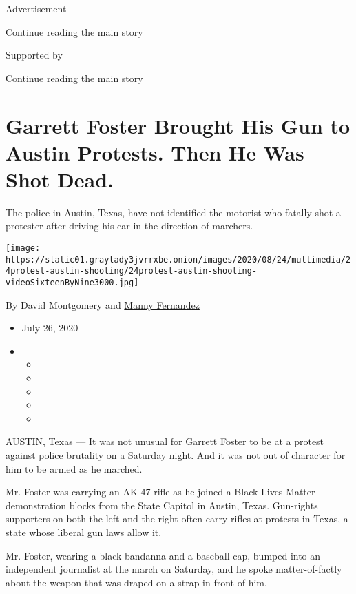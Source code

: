 Advertisement

\protect\hyperlink{after-top}{Continue reading the main story}

Supported by

\protect\hyperlink{after-sponsor}{Continue reading the main story}

\hypertarget{garrett-foster-brought-his-gun-to-austin-protests-then-he-was-shot-dead}{%
\section{Garrett Foster Brought His Gun to Austin Protests. Then He Was
Shot
Dead.}\label{garrett-foster-brought-his-gun-to-austin-protests-then-he-was-shot-dead}}

The police in Austin, Texas, have not identified the motorist who
fatally shot a protester after driving his car in the direction of
marchers.

\texttt{[image: https://static01.graylady3jvrrxbe.onion/images/2020/08/24/multimedia/24protest-austin-shooting/24protest-austin-shooting-videoSixteenByNine3000.jpg]}

By David Montgomery and
\href{https://www.nytimes3xbfgragh.onion/by/manny-fernandez}{Manny
Fernandez}

\begin{itemize}
\item
  July 26, 2020
\item
  \begin{itemize}
  \item
  \item
  \item
  \item
  \item
  \end{itemize}
\end{itemize}

AUSTIN, Texas --- It was not unusual for Garrett Foster to be at a
protest against police brutality on a Saturday night. And it was not out
of character for him to be armed as he marched.

Mr. Foster was carrying an AK-47 rifle as he joined a Black Lives Matter
demonstration blocks from the State Capitol in Austin, Texas. Gun-rights
supporters on both the left and the right often carry rifles at protests
in Texas, a state whose liberal gun laws allow it.

Mr. Foster, wearing a black bandanna and a baseball cap, bumped into an
independent journalist at the march on Saturday, and he spoke
matter-of-factly about the weapon that was draped on a strap in front of
him.

